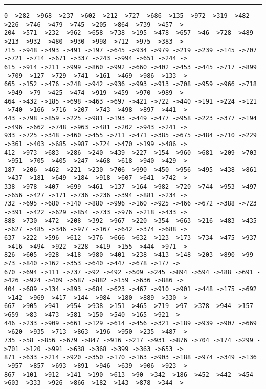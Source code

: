 \documentclass[letter, 12pt]{article}
\newenvironment{question}[1]{%
    \vspace{.2in}%
        \noindent{\bf #1}%
    \vspace{0.3em} \hrule \vspace{.1in}%
}{}
\begin{document}
\begin{question}{\large Appendix}
\begin{lstlisting}[style=CStyle]
0 ->282 ->968 ->237 ->602 ->212 ->727 ->686 ->135 ->972 ->319 ->482 ->226 ->746 ->479 ->745 ->205 ->864 ->739 ->457 ->
204 ->571 ->232 ->962 ->658 ->738 ->195 ->478 ->657 ->46 ->728 ->489 ->213 ->932 ->480 ->930 ->998 ->712 ->975 ->383 ->
715 ->948 ->493 ->491 ->197 ->645 ->934 ->979 ->219 ->239 ->145 ->707 ->721 ->714 ->671 ->337 ->243 ->994 ->651 ->244 ->
615 ->914 ->211 ->999 ->860 ->992 ->660 ->402 ->453 ->445 ->717 ->899 ->709 ->127 ->729 ->741 ->161 ->469 ->986 ->133 ->
665 ->152 ->476 ->248 ->942 ->936 ->993 ->913 ->708 ->959 ->966 ->718 ->949 ->79 ->425 ->474 ->919 ->459 ->970 ->989 ->
464 ->432 ->185 ->698 ->463 ->697 ->421 ->722 ->440 ->191 ->224 ->121 ->740 ->166 ->716 ->207 ->743 ->498 ->897 ->441 ->
443 ->798 ->859 ->225 ->981 ->193 ->449 ->477 ->958 ->223 ->377 ->194 ->496 ->662 ->748 ->963 ->481 ->202 ->943 ->241 ->
933 ->725 ->348 ->460 ->455 ->711 ->471 ->385 ->675 ->484 ->710 ->229 ->361 ->403 ->685 ->987 ->724 ->470 ->199 ->486 ->
412 ->973 ->683 ->286 ->240 ->439 ->227 ->154 ->960 ->681 ->209 ->703 ->951 ->705 ->405 ->247 ->468 ->618 ->940 ->429 ->
187 ->206 ->462 ->221 ->230 ->706 ->990 ->450 ->956 ->495 ->438 ->861 ->437 ->181 ->649 ->184 ->918 ->607 ->641 ->742 ->
338 ->978 ->407 ->699 ->461 ->137 ->164 ->982 ->720 ->744 ->953 ->497 ->656 ->427 ->171 ->736 ->236 ->394 ->881 ->234 ->
732 ->695 ->680 ->140 ->880 ->996 ->160 ->925 ->466 ->672 ->388 ->723 ->391 ->422 ->629 ->854 ->733 ->976 ->218 ->433 ->
888 ->730 ->472 ->208 ->392 ->967 ->220 ->354 ->663 ->216 ->483 ->435 ->627 ->485 ->346 ->977 ->167 ->642 ->374 ->688 ->
637 ->222 ->596 ->612 ->376 ->666 ->632 ->123 ->173 ->734 ->475 ->937 ->416 ->494 ->922 ->228 ->419 ->155 ->444 ->971 ->
826 ->605 ->928 ->418 ->980 ->401 ->238 ->413 ->148 ->203 ->890 ->99 ->73 ->840 ->162 ->353 ->640 ->447 ->678 ->177 ->
670 ->694 ->111 ->737 ->92 ->492 ->509 ->245 ->894 ->594 ->488 ->691 ->426 ->924 ->409 ->587 ->882 ->159 ->636 ->886 ->
404 ->689 ->134 ->893 ->684 ->623 ->467 ->910 ->901 ->448 ->175 ->692 ->142 ->969 ->417 ->144 ->984 ->180 ->889 ->330 ->
667 ->905 ->941 ->954 ->938 ->151 ->465 ->719 ->97 ->378 ->944 ->157 ->659 ->83 ->473 ->581 ->150 ->540 ->165 ->921 ->
446 ->233 ->909 ->661 ->129 ->614 ->456 ->321 ->189 ->939 ->907 ->669 ->620 ->935 ->713 ->863 ->196 ->950 ->235 ->487 ->
735 ->58 ->856 ->679 ->847 ->916 ->217 ->931 ->876 ->704 ->174 ->299 ->701 ->120 ->991 ->638 ->368 ->399 ->363 ->653 ->
871 ->633 ->214 ->920 ->350 ->170 ->163 ->903 ->188 ->974 ->349 ->136 ->957 ->857 ->693 ->891 ->946 ->639 ->906 ->923 ->
867 ->101 ->912 ->141 ->190 ->613 ->90 ->342 ->186 ->452 ->442 ->454 ->603 ->333 ->926 ->866 ->182 ->143 ->878 ->344 ->

\end{lstlisting}
\end{question}
\end{document}
